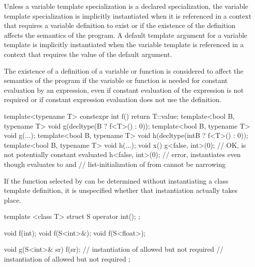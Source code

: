 \pnum
Unless a variable template specialization is a declared specialization,
the variable template specialization is implicitly instantiated
when it is referenced in a context
that requires a variable definition to exist or
if the existence of the definition affects the semantics of the program.
A default template argument for a variable template is implicitly instantiated
when the variable template is referenced in a context
that requires the value of the default argument.

\pnum
{}%
%
%
%
The existence of a definition of a variable or function
is considered to affect the semantics of the program
if the variable or function
is needed for constant evaluation by an expression,
even if constant evaluation of the expression is not required or
if constant expression evaluation does not use the definition.

\begin{example}
\begin{codeblock}
template<typename T> constexpr int f() { return T::value; }
template<bool B, typename T> void g(decltype(B ? f<T>() : 0));
template<bool B, typename T> void g(...);
template<bool B, typename T> void h(decltype(int{B ? f<T>() : 0}));
template<bool B, typename T> void h(...);
void x() {
  g<false, int>(0); // OK,  is not potentially constant evaluated
  h<false, int>(0); // error, instantiates  even though  evaluates to  and
                    // list-initialization of  from  cannot be narrowing
}
\end{codeblock}
\end{example}

\pnum
If the function selected by 
can be determined without instantiating a class template definition,
it is unspecified whether that instantiation actually takes place.
\begin{example}
\begin{codeblock}
template <class T> struct S {
  operator int();
};

void f(int);
void f(S<int>&);
void f(S<float>);

void g(S<int>& sr) {
  f(sr);            // instantiation of  allowed but not required
                    // instantiation of  allowed but not required
};
\end{codeblock}
\end{example}

